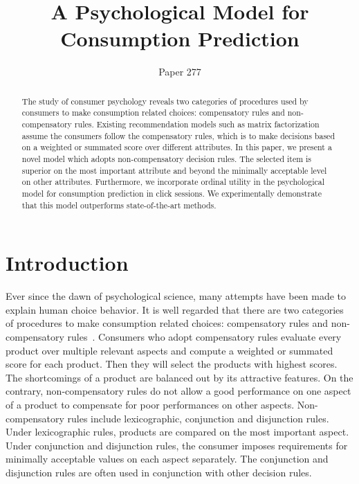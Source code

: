 \documentclass[sigconf]{acmart}
\begin{document}
\title{A Psychological Model for Consumption Prediction}


\author{Paper 277}


\begin{abstract}
The study of consumer psychology reveals two categories of procedures used by consumers to make consumption related choices: compensatory rules and non-compensatory rules. Existing recommendation models such as matrix factorization assume the consumers follow the compensatory rules, which is to make decisions based on a weighted or summated score over different attributes. In this paper, we present a novel model which adopts non-compensatory decision rules. The selected item is superior on the most  important attribute and beyond the minimally acceptable level on other attributes. Furthermore, we incorporate ordinal utility in the psychological model for consumption prediction in click sessions. We experimentally demonstrate that this model outperforms state-of-the-art methods.
\end{abstract}


\maketitle
\section{Introduction}\label{sec:introduction}

Ever since the dawn of psychological science, many attempts have been made to explain human choice behavior. It is well regarded that there are two categories of procedures to make consumption related choices: compensatory rules and non-compensatory rules~\cite{Engel1986Consumer}. Consumers who adopt compensatory rules evaluate every product over multiple relevant aspects and compute a weighted or summated score for each product. Then they will select the products with highest scores. The shortcomings of a product are balanced out by its attractive features. On the contrary, non-compensatory rules do not allow a good performance on one aspect of a product to compensate for poor performances on other aspects. Non-compensatory rules include lexicographic, conjunction and disjunction rules. Under lexicographic rules, products are compared on the most important aspect. Under conjunction  and disjunction rules, the consumer imposes requirements for minimally acceptable values on each aspect separately.  The conjunction and disjunction rules are often used in conjunction with other decision rules.
\end{document}
